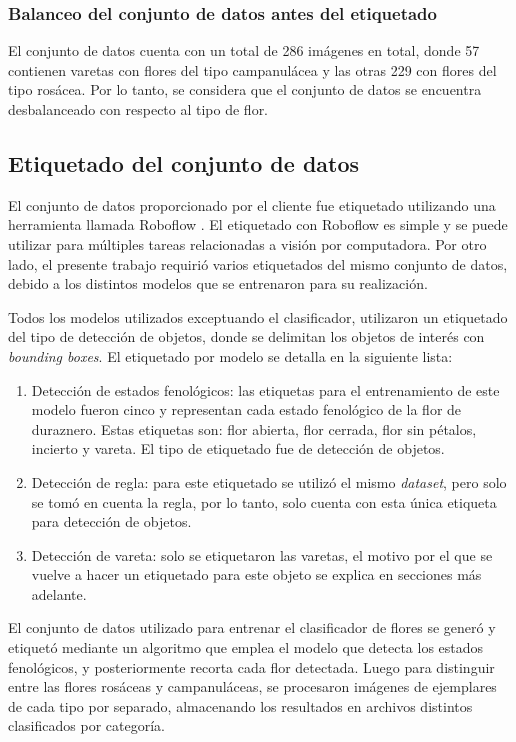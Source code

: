 \subsubsection{Balanceo del conjunto de datos antes del etiquetado}

El conjunto de datos cuenta con un total de 286 imágenes en total, donde 57 contienen varetas con flores del tipo campanulácea y las otras 229 con flores del tipo rosácea. Por lo tanto, se considera que el conjunto de datos se encuentra desbalanceado con respecto al tipo de flor. 

\subsection{Etiquetado del conjunto de datos}

El conjunto de datos proporcionado por el cliente fue etiquetado utilizando una herramienta llamada Roboflow \cite{WEBSITE:9}. El etiquetado con Roboflow es simple y se puede utilizar para múltiples tareas relacionadas a visión por computadora. Por otro lado, el presente trabajo requirió varios etiquetados del mismo conjunto de datos, debido a los distintos modelos que se entrenaron para su realización.

Todos los modelos utilizados exceptuando el clasificador, utilizaron un etiquetado del tipo de detección de objetos, donde se delimitan los objetos de interés con \textit{bounding boxes}. El etiquetado por modelo se detalla en la siguiente lista:

\begin{enumerate}
	\item Detección de estados fenológicos: las etiquetas para el entrenamiento de este modelo fueron cinco y representan cada estado fenológico de la flor de duraznero. Estas etiquetas son: flor abierta, flor cerrada, flor sin pétalos, incierto y vareta. El tipo de etiquetado fue de detección de objetos.
	\item Detección de regla: para este etiquetado se utilizó el mismo \textit{dataset}, pero solo se tomó en cuenta la regla, por lo tanto, solo cuenta con esta única etiqueta para detección de objetos.
	\item Detección de vareta: solo se etiquetaron las varetas, el motivo por el que se vuelve a hacer un etiquetado para este objeto se explica en secciones más adelante.
\end{enumerate}

El conjunto de datos utilizado para entrenar el clasificador de flores se generó y etiquetó mediante un algoritmo que emplea el modelo que detecta los estados fenológicos, y posteriormente recorta cada flor detectada. Luego para distinguir entre las flores rosáceas y campanuláceas, se procesaron imágenes de ejemplares de cada tipo por separado, almacenando los resultados en archivos distintos clasificados por categoría.

